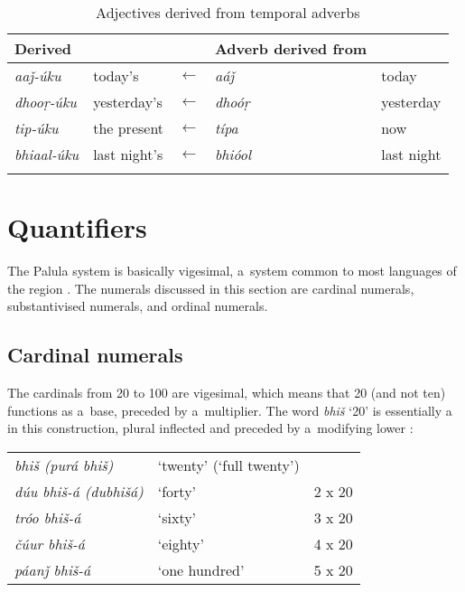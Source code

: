 {\begin{table}[ht]
\caption{Adjectives derived from temporal adverbs}

\begin{tabularx}{\textwidth}{ Q l l Q l }
\lsptoprule
Derived  &
&
&
Adverb derived from &
\\\hline
\textit{aaǰ-úku} &
today's &
$\leftarrow$ &
\textit{aáǰ} &
today\\
\textit{dhooṛ-úku} &
yesterday's &
$\leftarrow$ &
\textit{dhoóṛ} &
yesterday\\
\textit{tip-úku} &
the present &
$\leftarrow$ &
\textit{típa} &
now\\
\textit{bhiaal-úku} &
last night's &
$\leftarrow$ &
\textit{bhióol} &
last night\\\lspbottomrule
\end{tabularx}
\label{tab:6-6}
\end{table}


\section{Quantifiers}
\label{sec:6-4}

The Palula  system is basically vigesimal, a~system common to most languages of the region \citep[823]{bashir2003}. The numerals discussed in this section are cardinal numerals, substantivised numerals, and ordinal numerals.


\subsection{Cardinal numerals}
\label{subsec:6-4-1}

The cardinals from 20 to 100 are vigesimal, which means that 20 (and not ten) functions as a~base, preceded by a~multiplier. The word \textit{bhiš} `20' is essentially a~ in this construction, plural inflected and preceded by a~modifying lower : 



\begin{table}[H]
\begin{tabularx}{\textwidth}{ Q Q l@{\hspace{50pt}} }

\textit{bhiš (purá bhiš)} &
`twenty' (`full twenty') &
\\
\textit{dúu bhiš-á (dubhišá)} &
`forty' &
2 x 20\\
\textit{tróo bhiš-á} &
`sixty' &
3 x 20\\
\textit{čúur bhiš-á} &
`eighty' &
4 x 20\\
\textit{páanǰ bhiš-á} &
`one hundred' &
5 x 20\\
\end{tabularx}
\end{table}


}
